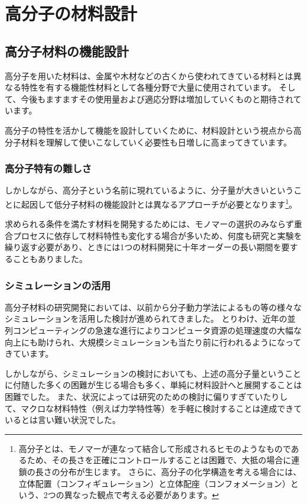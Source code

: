 \documentclass[a4paper,11pt]{jlreq}
\begin{document}
\section{高分子の材料設計}

\subsection{高分子材料の機能設計}
高分子を用いた材料は、金属や木材などの古くから使われてきている材料とは異なる特性を有する機能性材料として各種分野で大量に使用されています。
そして、今後もますますその使用量および適応分野は増加していくものと期待されています。

高分子の特性を活かして機能を設計していくために、材料設計という視点から高分子材料を理解して使いこなしていく必要性も日増しに高まってきています。

\subsubsection{高分子特有の難しさ}
しかしながら、高分子という名前に現れているように、分子量が大きいということに起因して低分子材料の機能設計とは異なるアプローチが必要となります\footnote{
    高分子とは、モノマーが連なって結合して形成されるヒモのようなものであるため、その長さを正確にコントロールすることは困難で、大抵の場合に連鎖の長さの分布が生じます。
さらに、高分子の化学構造を考える場合には、立体配置（コンフィギュレーション）と立体配座（コンフォメーション）という、2つの異なった観点で考える必要があります。
}。

求められる条件を満たす材料を開発するためには、モノマーの選択のみならず重合プロセスに依存して材料特性も変化する場合が多いため、何度も研究と実験を繰り返す必要があり、ときには1つの材料開発に十年オーダーの長い期間を要することもありました。

\subsubsection{シミュレーションの活用}
高分子材料の研究開発においては、以前から分子動力学法によるもの等の様々なシミュレーションを活用した検討が進められてきました。
とりわけ、近年の並列コンピューティングの急速な進行によりコンピュータ資源の処理速度の大幅な向上にも助けられ、大規模シミュレーションも当たり前に行われるようになってきています。

しかしながら、シミュレーションの検討においても、上述の高分子量ということに付随した多くの困難が生じる場合も多く、単純に材料設計へと展開することは困難でした。
また、状況によっては研究のための検討に偏りすぎていたりして、マクロな材料特性（例えば力学特性等）を手軽に検討することは達成できているとは言い難い状況でした。
\end{document}
